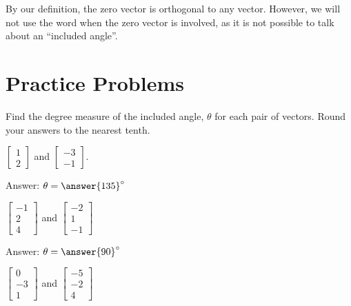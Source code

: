 \documentclass{ximera}
\begin{document}
\begin{remark}  By our definition, the zero vector is orthogonal to any vector.  However, we will not use the word  when the zero vector is involved, as it is not possible to talk about an ``included angle''.
\end{remark}
 
 
\section*{Practice Problems}
\begin{problem}%
Find the degree measure of the included angle, $\theta$ for each pair of vectors.  Round your answers to the nearest tenth.
  \begin{problem}\label{prob:anglebetweenvectors1}
  $\begin{bmatrix}1\\2\end{bmatrix}$ and $\begin{bmatrix}-3\\-1\end{bmatrix}$.
   
  Answer: $\theta=\answer{135}^\circ$
  \end{problem}
   
  \begin{problem}\label{prob:anglebetweenvectors2}
  $\begin{bmatrix}-1\\2\\4\end{bmatrix}$ and $\begin{bmatrix}-2\\1\\-1\end{bmatrix}$
   
   Answer: $\theta=\answer{90}^\circ$
  \end{problem}
 
\begin{problem}\label{prob:anglebetweenvectors3}
  $\begin{bmatrix}0\\-3\\1\end{bmatrix}$ and $\begin{bmatrix}-5\\-2\\4\end{bmatrix}$
   

\end{problem}
\end{problem}
\end{document}

